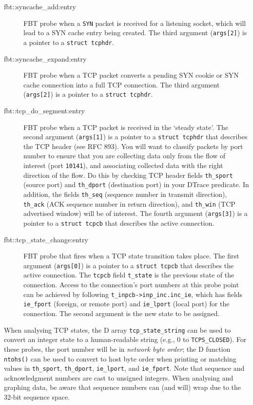 \documentclass[a4paper,10pt]{article}
\begin{document}
\begin{description}
\item[fbt::syncache\_add:entry] FBT probe when a \texttt{SYN} packet is
  received for a listening socket, which will lead to a SYN cache entry being
  created.
  The third argument (\texttt{args[2]}) is a pointer to a \texttt{struct
  tcphdr}.

\item[fbt::syncache\_expand:entry] FBT probe when a TCP packet converts a
  pending SYN cookie or SYN cache connection into a full TCP connection.
  The third argument (\texttt{args[2]}) is a pointer to a \texttt{struct
  tcphdr}.

\item[fbt::tcp\_do\_segment:entry] FBT probe when a TCP packet is received in
  the `steady state'.
  The second argument (\texttt{args[1]}) is a pointer to a \texttt{struct
  tcphdr} that describes the TCP header (see RFC 893).
  You will want to classify packets by port number to ensure that you are
  collecting data only from the flow of interest (port \texttt{10141}), and
  associating collected data with the right direction of the flow.
  Do this by checking TCP header fields \texttt{th\_sport} (source port) and
  \texttt{th\_dport} (destination port) in your DTrace predicate.
  In addition, the fields \texttt{th\_seq} (sequence number in transmit
  direction), \texttt{th\_ack} (ACK sequence number in return direction), and
  \texttt{th\_win} (TCP advertised window) will be of interest.
  The fourth argument (\texttt{args[3]}) is a pointer to a \texttt{struct
  tcpcb} that describes the active connection.

\item[fbt::tcp\_state\_change:entry] FBT probe that fires when a TCP state
  transition takes place.
  The first argument (\texttt{args[0]}) is a pointer to a \texttt{struct
  tcpcb} that describes the active connection.
  The \texttt{tcpcb} field \texttt{t\_state} is the previous state of the
  connection.
  Access to the connection's port numbers at this probe point can be
  achieved by following \texttt{t\_inpcb->inp\_inc.inc\_ie}, which
  has fields \texttt{ie\_fport} (foreign, or remote port) and
  \texttt{ie\_lport} (local port) for the connection.
  The second argument is the new state to be assigned.
\end{description}

When analysing TCP states, the D array \texttt{tcp\_state\_string} can be used
to convert an integer state to a human-readable string (e.g., 0 to
\texttt{TCPS\_CLOSED}).
For these probes, the port number will be in \textit{network byte order}; the
D function \texttt{ntohs()} can be used to convert to host byte order when
printing or matching values in \texttt{th\_sport}, \texttt{th\_dport},
\texttt{ie\_lport}, and \texttt{ie\_fport}.
Note that sequence and acknowledgment numbers are cast to unsigned integers.
When analysing and graphing data, be aware that sequence numbers can (and
will) wrap due to the 32-bit sequence space.
\end{document}
